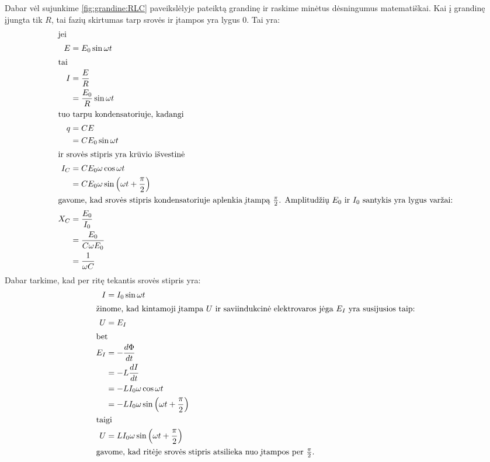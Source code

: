 Dabar vėl sujunkime \ref{fig:grandine:RLC} paveikslėlyje pateiktą grandinę
ir raskime minėtus dėsningumus matematiškai. Kai į grandinę įjungta tik
$R$, tai fazių skirtumas tarp srovės ir įtampos yra lygus 0. Tai yra:
\begin{align*}
  \intertext{jei}
  E
    &= E_{0} \sin \omega t \\
  \intertext{tai}
  I
    &= \frac{E}{R} \\
    &= \frac{E_{0}}{R} \sin \omega t \\
  \intertext{tuo tarpu kondensatoriuje, kadangi}
  q
    &= CE \\
    &= C E_{0} \sin \omega t \\
  \intertext{ir srovės stipris yra krūvio išvestinė}
  I_{C}
    &= C E_{0} \omega \cos \omega t \\
    &= C E_{0} \omega \sin \left( \omega t + \frac{\pi}{2} \right) \\
  \intertext{gavome, kad srovės stipris kondensatoriuje aplenkia įtampą
  $\frac{\pi}{2}$. Amplitudžių $E_{0}$ ir $I_{0}$ santykis yra lygus
  varžai:}
  X_{C}
    &= \frac{E_{0}}{I_{0}} \\
    &= \frac{E_{0}}{C \omega E_{0}} \\
    &= \frac{1}{\omega C} \\
\end{align*}
Dabar tarkime, kad per ritę tekantis srovės stipris yra:
\begin{align*}
  I
    &= I_{0} \sin \omega t \\
  \intertext{žinome, kad kintamoji įtampa $U$ ir saviindukcinė
  elektrovaros jėga $E_{I}$ yra susijusios taip:}
  U
    &= E_{I} \\
  \intertext{bet}
  E_{I}
    &= - \frac{d \Phi}{d t} \\
    &= - L \frac{d I}{d t} \\
    &= - L I_{0} \omega \cos \omega t \\
    &= - L I_{0} \omega \sin \left( \omega t + \frac{\pi}{2} \right) \\
  \intertext{taigi}
  U
    &= L I_{0} \omega \sin \left( \omega t + \frac{\pi}{2} \right) \\
  \intertext{gavome, kad ritėje srovės stipris atsilieka nuo įtampos
  per $\frac{\pi}{2}$.}
\end{align*}

